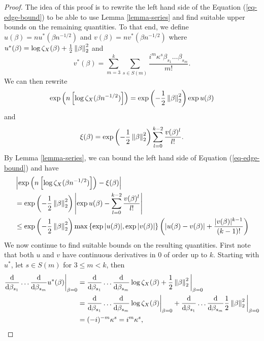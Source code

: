 \begin{proof}
    The idea of this proof is to rewrite the left hand side of the Equation (\ref{eq-edge-bound}) to be able to use Lemma \ref{lemma-series} and find suitable upper bounds on the remaining quantities. To that end, we define $u(\beta) = n u^*(\beta n^{-1/2})$ and $v(\beta) = nv^*(\beta n^{-1/2})$ where $u^*(\beta) = \log \zeta_X(\beta) + \frac{1}{2}\left\lVert\beta\right\rVert_2^2$ and 
    \begin{equation*}
        v^*(\beta) = \sum_{m=3}^k \sum_{s \in S(m)} \frac{i^m\kappa^s\beta_{s_1}\ldots\beta_{s_m}}{m!}.
    \end{equation*}
    We can then rewrite
    \begin{equation*}
        \exp\left(n\left[\log \zeta_X(\beta n^{-1/2})\right]\right) = \exp\left(-\frac{1}{2}\left\lVert\beta\right\rVert_2^2\right)\exp u(\beta)
    \end{equation*}
    and
    \begin{equation*}
        \xi(\beta) = \exp\left(-\frac{1}{2}\left\lVert\beta\right\rVert_2^2\right)\sum_{l=0}^{k-2} \frac{v(\beta)^l}{l!}.
    \end{equation*}
    By Lemma \ref{lemma-series}, we can bound the left hand side of Equation (\ref{eq-edge-bound}) and have
    \begin{align*}
        &\left|\exp\left(n\left[\log \zeta_X(\beta n^{-1/2})\right]\right) - \xi(\beta)\right| \\
        &= \exp\left(-\frac{1}{2}\left\lVert\beta\right\rVert_2^2\right)\left|\exp u(\beta) - \sum_{l=0}^{k-2} \frac{v(\beta)^l}{l!}\right|\\
        &\leq \exp\left(-\frac{1}{2}\left\lVert\beta\right\rVert_2^2\right) \max \left\{ \exp{|u(\beta)|}, \exp{|v(\beta)|} \right\}\left(\left|u(\beta) - v(\beta)\right| + \frac{|v(\beta)|^{k-1}}{(k-1)!}\right)
    \end{align*}
    We now continue to find suitable bounds on the resulting quantities. First note that both $u$ and $v$ have continuous derivatives in 0 of order up to $k$. Starting with $u^*$, let $s \in S(m)$ for $3 \leq m < k$, then
    \begin{align*}
        \ddx{\beta_{s_1}}\ldots\ddx{\beta_{s_m}} u^*(\beta) \bigg|_{\beta=0}
        &= \ddx{\beta_{s_1}}\ldots\ddx{\beta_{s_m}} \log \zeta_X(\beta) + \frac{1}{2}\norm{\beta}_2^2\bigg|_{\beta=0}\\
        &=  \ddx{\beta_{s_1}}\ldots\ddx{\beta_{s_m}} \log \zeta_X(\beta)\bigg|_{\beta=0}
            +
            \ddx{\beta_{s_1}}\ldots\ddx{\beta_{s_m}} \frac{1}{2}\norm{\beta}_2^2\bigg|_{\beta=0}
        \\
        &= (-i)^{-m}\kappa^s = i^m \kappa^s ,

\end{align*}
\end{proof}
